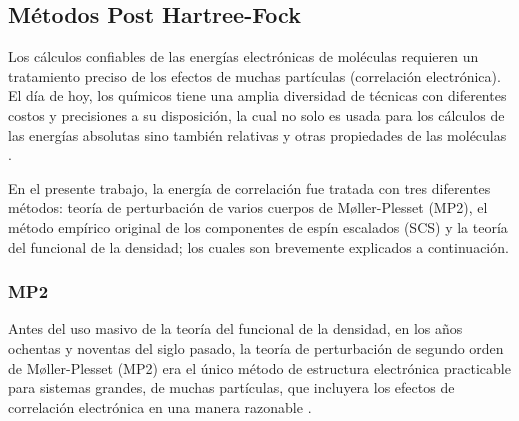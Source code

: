 \subsection{M\'etodos Post Hartree-Fock}

Los c\'alculos confiables de las energ\'ias electr\'onicas de mol\'eculas
requieren un tratamiento preciso de los efectos de muchas 
part\'iculas (correlaci\'on electr\'onica). El d\'ia de hoy, los 
qu\'imicos tiene una amplia diversidad de t\'ecnicas con diferentes 
costos y precisiones a su disposici\'on, la cual no solo es usada 
para los c\'alculos de las energ\'ias absolutas sino tambi\'en
relativas y otras propiedades de las mol\'eculas \citep{Grim2003}. 

En el presente trabajo, la energ\'ia de correlaci\'on fue tratada con
tres diferentes m\'etodos: teor\'ia de perturbaci\'on de varios 
cuerpos de M\o ller-Plesset (MP2), el m\'etodo emp\'irico original de 
los componentes de esp\'in escalados (SCS) y la teor\'ia del 
funcional de la densidad; los cuales son brevemente explicados a 
continuaci\'on.

\subsubsection{MP2}
Antes del uso masivo de la teor\'ia del funcional de la densidad, 
en los a\~nos ochentas y noventas del siglo pasado, la teor\'ia de 
perturbaci\'on de segundo orden de M\o ller-Plesset (MP2) era el
\'unico m\'etodo de estructura electr\'onica practicable para 
sistemas grandes, de muchas part\'iculas, que incluyera los efectos
de correlaci\'on electr\'onica en una manera razonable 
\citep{Grim2012}.

